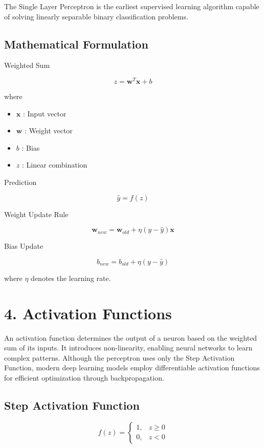 \documentclass[11pt]{article}
\begin{document}
The Single Layer Perceptron is the earliest supervised learning algorithm capable of solving linearly separable binary classification problems.

\subsection*{Mathematical Formulation}

Weighted Sum

\[
z=\mathbf{w}^{T}\mathbf{x}+b
\]

where

\begin{itemize}
\item $\mathbf{x}$ : Input vector
\item $\mathbf{w}$ : Weight vector
\item $b$ : Bias
\item $z$ : Linear combination
\end{itemize}

Prediction

\[
\hat y=f(z)
\]

Weight Update Rule

\[
\mathbf{w}_{new}
=
\mathbf{w}_{old}
+
\eta
(y-\hat y)
\mathbf{x}
\]

Bias Update

\[
b_{new}
=
b_{old}
+
\eta
(y-\hat y)
\]

where $\eta$ denotes the learning rate.


\section*{4. Activation Functions}

An activation function determines the output of a neuron based on the weighted sum of its inputs. It introduces non-linearity, enabling neural networks to learn complex patterns. Although the perceptron uses only the Step Activation Function, modern deep learning models employ differentiable activation functions for efficient optimization through backpropagation.

\subsection*{Step Activation Function}

\[
f(z)=
\begin{cases}
1,&z\ge0\\
0,&z<0
\end{cases}
\]
\end{document}
